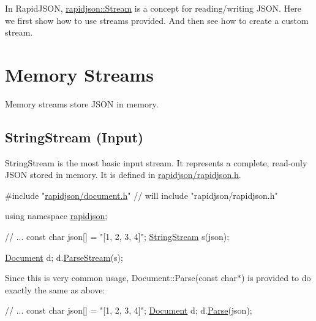 In Rapid\+J\+S\+ON, {\ttfamily \hyperlink{classrapidjson_1_1_stream}{rapidjson\+::\+Stream}} is a concept for reading/writing J\+S\+ON. Here we first show how to use streams provided. And then see how to create a custom stream.\hypertarget{md_Commun_Externe_RapidJSON_doc_stream.zh-cn_MemoryStreams}{}\section{Memory Streams}\label{md_Commun_Externe_RapidJSON_doc_stream.zh-cn_MemoryStreams}
Memory streams store J\+S\+ON in memory.\hypertarget{md_Commun_Externe_RapidJSON_doc_stream.zh-cn_StringStream}{}\subsection{String\+Stream (\+Input)}\label{md_Commun_Externe_RapidJSON_doc_stream.zh-cn_StringStream}
{\ttfamily String\+Stream} is the most basic input stream. It represents a complete, read-\/only J\+S\+ON stored in memory. It is defined in {\ttfamily \hyperlink{rapidjson_8h}{rapidjson/rapidjson.\+h}}.


\begin{DoxyCode}
\textcolor{preprocessor}{#include "\hyperlink{document_8h}{rapidjson/document.h}"} \textcolor{comment}{// will include "rapidjson/rapidjson.h"}

\textcolor{keyword}{using namespace }\hyperlink{namespacerapidjson}{rapidjson};

\textcolor{comment}{// ...}
\textcolor{keyword}{const} \textcolor{keywordtype}{char} json[] = \textcolor{stringliteral}{"[1, 2, 3, 4]"};
\hyperlink{struct_generic_string_stream}{StringStream} s(json);

\hyperlink{class_generic_document}{Document} d;
d.\hyperlink{class_generic_document_afe94c0abc83a20f2d7dc1ba7677e6238}{ParseStream}(s);
\end{DoxyCode}


Since this is very common usage, {\ttfamily Document\+::\+Parse(const char$\ast$)} is provided to do exactly the same as above\+:


\begin{DoxyCode}
\textcolor{comment}{// ...}
\textcolor{keyword}{const} \textcolor{keywordtype}{char} json[] = \textcolor{stringliteral}{"[1, 2, 3, 4]"};
\hyperlink{class_generic_document}{Document} d;
d.\hyperlink{class_generic_document_aebd4e7fddd80c1e1174837aee6d2159b}{Parse}(json);
\end{DoxyCode}


